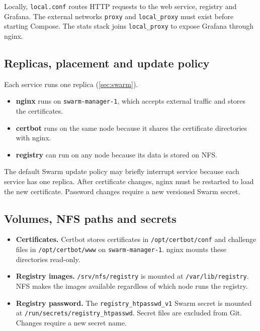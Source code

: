Locally, \texttt{local.conf} routes HTTP requests to the web service,
registry and Grafana. The external networks \texttt{proxy} and
\texttt{local\_proxy} must exist before starting Compose. The stats
stack joins \texttt{local\_proxy} to expose Grafana through nginx.

\subsection{Replicas, placement and update policy}

Each service runs one replica (\cref{sec:swarm}).

\begin{itemize}
  \item \textbf{nginx} runs on \texttt{swarm-manager-1}, which accepts
        external traffic and stores the certificates.
  \item \textbf{certbot} runs on the same node because it shares the
        certificate directories with nginx.
  \item \textbf{registry} can run on any node because its data is stored
        on NFS.
\end{itemize}

The default Swarm update policy may briefly interrupt service because
each service has one replica. After certificate changes, nginx must be
restarted to load the new certificate. Password changes require a new
versioned Swarm secret.

\subsection{Volumes, NFS paths and secrets}

\begin{itemize}
  \item \textbf{Certificates.} Certbot stores certificates in
        \texttt{/opt/certbot/conf} and challenge files in
        \texttt{/opt/certbot/www} on \texttt{swarm-manager-1}.
        nginx mounts these directories read-only.
  \item \textbf{Registry images.} \texttt{/srv/nfs/registry} is mounted
        at \texttt{/var/lib/registry}. NFS makes the images available
        regardless of which node runs the registry.
  \item \textbf{Registry password.} The
        \texttt{registry\_htpasswd\_v1} Swarm secret is mounted at
        \texttt{/run/secrets/registry\_htpasswd}. Secret files are
        excluded from Git. Changes require a new secret name.
\end{itemize}

